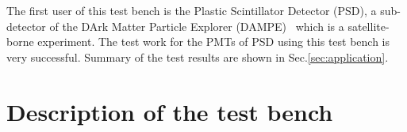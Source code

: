 \documentclass[a4paper,10pt,twoside]{cpc-hepnp}
\begin{document}
\begin{CJK*}{UTF8}{gbsn}
\begin{multicols}{2}
The first user of this test bench is the Plastic Scintillator Detector (PSD), a sub-detector of the DArk Matter Particle Explorer (DAMPE)~\citep{Chang_Jin_dampe} which is a satellite-borne experiment. 
The test work for the PMTs of PSD using this test bench is very successful. Summary of the test results are shown in Sec.\ref{sec:application}.

\section{Description of the test bench}
\label{sec:description}
	

\end{multicols}
\end{CJK*}
\end{document}
